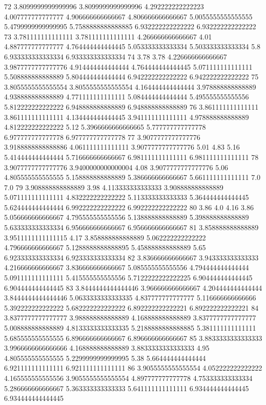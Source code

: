 72 3.8099999999999996 3.8099999999999996 4.292222222222223 4.007777777777777 4.906666666666667 4.806666666666667 5.0055555555555555 5.4799999999999995 5.7588888888888885 6.932222222222222 6.932222222222222
73 3.781111111111111 3.781111111111111 4.266666666666667 4.01 4.887777777777777 4.764444444444445 5.053333333333334 5.503333333333334 5.8 6.933333333333334 6.933333333333334
74 3.78 3.78 4.226666666666667 3.9877777777777776 4.914444444444444 4.764444444444445 5.071111111111111 5.508888888888889 5.804444444444444 6.942222222222222 6.942222222222222
75 3.8055555555555554 3.8055555555555554 4.164444444444444 3.978888888888889 4.938888888888889 4.771111111111111 5.084444444444444 5.495555555555556 5.812222222222222 6.948888888888889 6.948888888888889
76 3.861111111111111 3.861111111111111 4.134444444444445 3.941111111111111 4.978888888888889 4.812222222222222 5.12 5.3966666666666665 5.777777777777778 6.977777777777778 6.977777777777778
77 3.9077777777777776 3.9188888888888886 4.061111111111111 3.9077777777777776 5.01 4.83 5.16 5.414444444444444 5.716666666666667 6.981111111111111 6.981111111111111
78 3.9077777777777776 3.9400000000000004 4.08 3.9077777777777776 5.06 4.805555555555555 5.158888888888889 5.386666666666667 5.661111111111111 7.0 7.0
79 3.908888888888889 3.98 4.113333333333333 3.908888888888889 5.071111111111111 4.832222222222222 5.113333333333333 5.364444444444445 5.624444444444444 6.992222222222222 6.992222222222222
80 3.86 4.0 4.16 3.86 5.056666666666667 4.795555555555556 5.138888888888889 5.398888888888889 5.633333333333334 6.956666666666667 6.956666666666667
81 3.858888888888889 3.9511111111111115 4.17 3.858888888888889 5.062222222222222 4.796666666666667 5.1288888888888895 5.458888888888889 5.65 6.923333333333334 6.923333333333334
82 3.836666666666667 3.943333333333333 4.216666666666667 3.836666666666667 5.085555555555556 4.794444444444444 5.091111111111111 5.415555555555556 5.7122222222222225 6.904444444444445 6.904444444444445
83 3.8444444444444446 3.966666666666667 4.204444444444444 3.8444444444444446 5.0633333333333335 4.837777777777777 5.116666666666666 5.392222222222222 5.682222222222222 6.892222222222221 6.892222222222221
84 3.8377777777777777 3.988888888888889 4.168888888888889 3.8377777777777777 5.008888888888889 4.8133333333333335 5.2188888888888885 5.381111111111111 5.685555555555555 6.896666666666667 6.896666666666667
85 3.8833333333333333 3.9966666666666666 4.168888888888889 3.8833333333333333 4.95 4.805555555555555 5.2299999999999995 5.38 5.664444444444444 6.921111111111111 6.921111111111111
86 3.9055555555555554 4.052222222222222 4.165555555555556 3.9055555555555554 4.897777777777778 4.753333333333334 5.286666666666667 5.363333333333333 5.641111111111111 6.934444444444445 6.934444444444445

